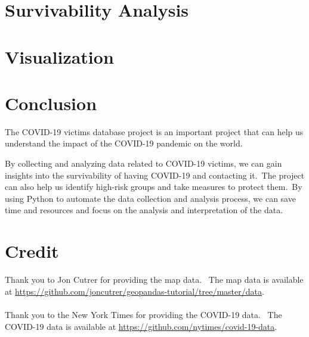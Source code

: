 \documentclass{article}
\begin{document}
\section{Survivability Analysis}


\section{Visualization}

\section{Conclusion}
The COVID-19 victims database project is an important project that can help us understand the impact of the COVID-19 pandemic on the world.\

By collecting and analyzing data related to COVID-19 victims, we can gain insights into the survivability of having COVID-19 and contacting it.\
The project can also help us identify high-risk groups and take measures to protect them.\
By using Python to automate the data collection and analysis process, we can save time and resources and focus on the analysis and interpretation of the data.

\section{Credit}
Thank you to Jon Cutrer for providing the map data. \
The map data is available at \url{https://github.com/joncutrer/geopandas-tutorial/tree/master/data}.
\\\\
Thank you to the New York Times for providing the COVID-19 data. \
The COVID-19 data is available at \url{https://github.com/nytimes/covid-19-data}.
\end{document}
